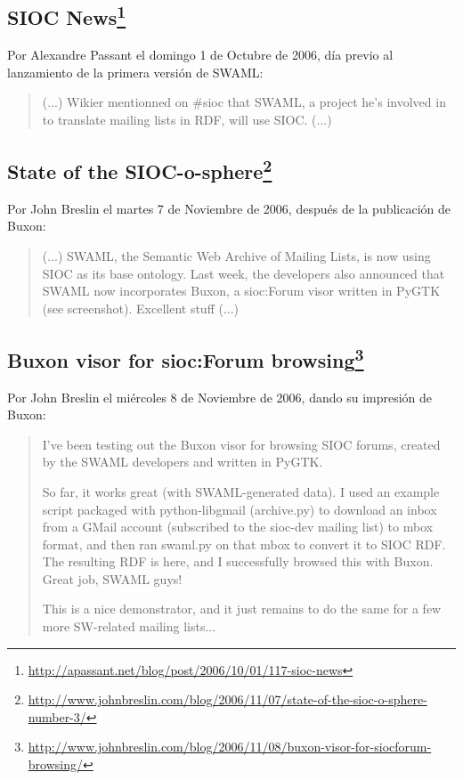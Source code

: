 \subsection*{SIOC News\footnote{\url{http://apassant.net/blog/post/2006/10/01/117-sioc-news}}}

Por Alexandre Passant el domingo 1 de Octubre de 2006, día previo al lanzamiento 
de la primera versión de SWAML:

\begin{quote}
 (...) Wikier mentionned on \#sioc that SWAML, a project he's involved in to translate mailing 
 lists in RDF, will use SIOC. (...)
\end{quote}

\subsection*{State of the SIOC-o-sphere\footnote{\url{http://www.johnbreslin.com/blog/2006/11/07/state-of-the-sioc-o-sphere-number-3/}}}

Por John Breslin el martes 7 de Noviembre de 2006, después de la publicación de Buxon:

\begin{quote}
 (...) SWAML, the Semantic Web Archive of Mailing Lists, is now using SIOC as its base 
 ontology. Last week, the developers also announced that SWAML now incorporates Buxon, a sioc:Forum 
 visor written in PyGTK (see screenshot). Excellent stuff  (...)
\end{quote}

\subsection*{Buxon visor for sioc:Forum browsing\footnote{\url{http://www.johnbreslin.com/blog/2006/11/08/buxon-visor-for-siocforum-browsing/}}}

Por John Breslin el miércoles 8 de Noviembre de 2006, dando su impresión de Buxon:

\begin{quote}
 I've been testing out the Buxon visor for browsing SIOC forums, created by the SWAML 
 developers and written in PyGTK.

 So far, it works great (with SWAML-generated data). I used an example script packaged 
 with python-libgmail (archive.py) to download an inbox from a GMail account (subscribed 
 to the sioc-dev mailing list) to mbox format, and then ran swaml.py on that mbox to 
 convert it to SIOC RDF. The resulting RDF is here, and I successfully browsed this with 
 Buxon. Great job, SWAML guys!

 This is a nice demonstrator, and it just remains to do the same for a few more 
 SW-related mailing lists...
\end{quote}

